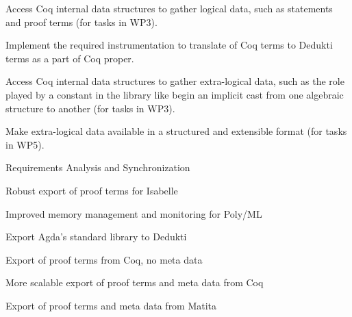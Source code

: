 \begin{workpackage}
\begin{tasklist}
\begin{task}[id=coq,
  title=Instrument Coq,
  lead=Bol,
  BolRM=12,
  InrRM=6,
  wphases=0-8]
\begin{compactitem}
\item Access Coq internal data structures to gather logical data, such as
statements and proof terms (for tasks in WP3).
\item Implement the required instrumentation to translate of Coq terms
to Dedukti terms as a part of Coq proper.
\item Access Coq internal data structures to gather extra-logical data,
such as the role played by a constant in the library like begin an implicit
cast from one algebraic structure to another (for tasks in WP3).
\item Make extra-logical data available in a structured and
  extensible format (for tasks in WP5).
\end{compactitem}
\end{task}
\end{tasklist}

\begin{wpdelivs}
  \begin{wpdeliv}[due=3,miles=startup,id=requirements,dissem=PU,nature=DEM,lead=Inr]
      {Requirements Analysis and Synchronization}
  \end{wpdeliv}
  \begin{wpdeliv}[due=12,miles=logipedia-v1,id=isabelle1,dissem=PU,nature=DEM,lead=Tum]
      {Robust export of proof terms for Isabelle}
  \end{wpdeliv}
  \begin{wpdeliv}[due=12,miles=logipedia-v1,id=isabelle1,dissem=PU,nature=DEM,lead=Tum]
      {Improved memory management and monitoring for Poly/ML}
  \end{wpdeliv}
  \begin{wpdeliv}[due=18,miles=logipedia-v2,id=agda,dissem=PU,nature=DEM,lead=Del]
      {Export Agda's standard library to Dedukti}
  \end{wpdeliv}
  \begin{wpdeliv}[due=8,miles=logipedia-v1,id=coq1,dissem=PU,nature=DEM,lead=Inr]
    {Export of proof terms from Coq, no meta data}
  \end{wpdeliv}
  \begin{wpdeliv}[due=24,miles=logipedia-v2,id=coq2,dissem=PU,nature=DEM,lead=Bol]
    {More scalable export of proof terms and meta data from Coq}
  \end{wpdeliv}
  \begin{wpdeliv}[due=12,miles=logipedia-v1,id=matita1,dissem=PU,nature=DEM,lead=Bol]
    {Export of proof terms and meta data from Matita}
  \end{wpdeliv}
\end{wpdelivs}
\end{workpackage}

